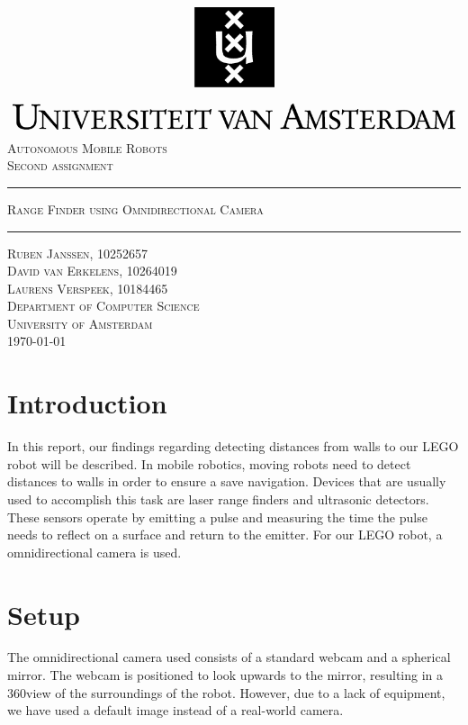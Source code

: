 \documentclass[12pt]{article}
\begin{document}
\begin{titlepage}
\begin{center}
    \includegraphics[width=\textwidth]{./logo.png}
    \\ [2.5cm]
    \textsc{\Large Autonomous Mobile Robots}
    \\ [0.5cm]
    \textsc{\large Second assignment}
    \\ [1cm]
    \hrule
    \vspace{0.3cm}
    \textsc{Range Finder using Omnidirectional Camera}
    \\ [0.3cm]
    \hrule
    \vfill
    \textsc{Ruben Janssen, 10252657 \\ David van Erkelens, 10264019 \\ Laurens Verspeek, 10184465 \\[0.7cm] Department of Computer Science \\ University of Amsterdam \\[0.3cm] \today}
\end{center}
\end{titlepage}
\tableofcontents
\clearpage
\section{Introduction}
In this report, our findings regarding detecting distances from walls to our LEGO robot will be described. In mobile robotics, moving robots need to detect distances to walls in order to ensure a save navigation. Devices that are usually used to accomplish this task are laser range finders and ultrasonic detectors. These sensors operate by emitting a pulse and measuring the time the pulse needs to reflect on a surface and return to the emitter. For our LEGO robot, a omnidirectional camera is used.
\section{Setup}
The omnidirectional camera used consists of a standard webcam and a spherical mirror. The webcam is positioned to look upwards to the mirror, resulting in a 360\textdegree view of the surroundings of the robot. However, due to a lack of equipment, we have used a default image instead of a real-world camera.
\end{document}
